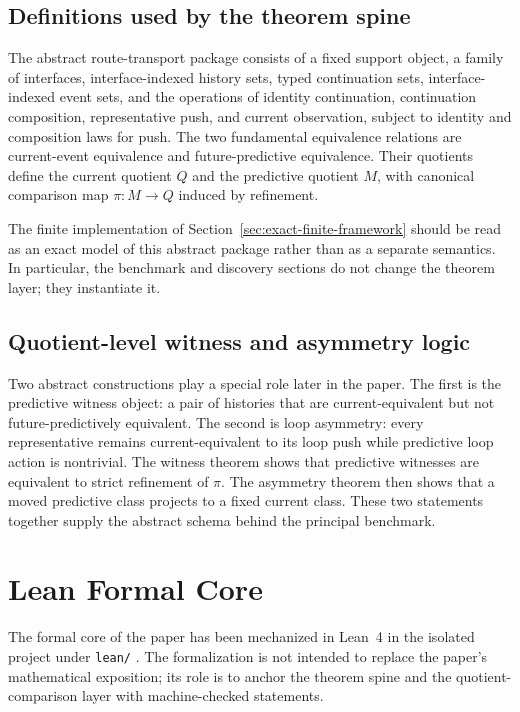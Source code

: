\documentclass[11pt]{article}
\newcommand{\CurrentQ}{Q}
\newcommand{\PredictiveQ}{M}
\theoremstyle{definition}
\begin{document}
\subsection{Definitions used by the theorem spine}\label{appsubsec:proof-definitions}
The abstract route-transport package consists of a fixed support object, a family of interfaces, interface-indexed history sets, typed continuation sets, interface-indexed event sets, and the operations of identity continuation, continuation composition, representative push, and current observation, subject to identity and composition laws for push. The two fundamental equivalence relations are current-event equivalence and future-predictive equivalence. Their quotients define the current quotient $\CurrentQ$ and the predictive quotient $\PredictiveQ$, with canonical comparison map $\pi : \PredictiveQ \to \CurrentQ$ induced by refinement.

The finite implementation of Section~\ref{sec:exact-finite-framework} should be read as an exact model of this abstract package rather than as a separate semantics. In particular, the benchmark and discovery sections do not change the theorem layer; they instantiate it.

\subsection{Quotient-level witness and asymmetry logic}\label{appsubsec:proof-witness-asymmetry}
Two abstract constructions play a special role later in the paper. The first is the predictive witness object: a pair of histories that are current-equivalent but not future-predictively equivalent. The second is loop asymmetry: every representative remains current-equivalent to its loop push while predictive loop action is nontrivial. The witness theorem shows that predictive witnesses are equivalent to strict refinement of $\pi$. The asymmetry theorem then shows that a moved predictive class projects to a fixed current class. These two statements together supply the abstract schema behind the principal benchmark.

\section{Lean Formal Core}\label{app:lean-core}
The formal core of the paper has been mechanized in Lean~4 in the isolated project under \texttt{lean/} \citep{deMouraUllrich2021Lean4}. The formalization is not intended to replace the paper’s mathematical exposition; its role is to anchor the theorem spine and the quotient-comparison layer with machine-checked statements.
\end{document}
